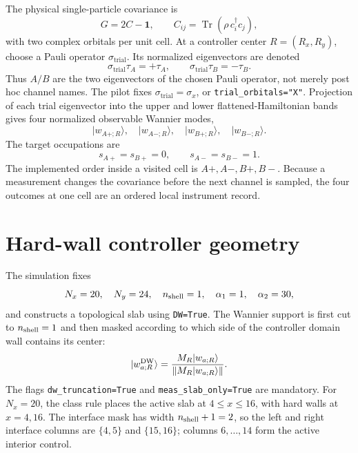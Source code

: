 \documentclass[aps,prb,onecolumn,nofootinbib,superscriptaddress]{revtex4-2}
\newcommand{\Tr}{\operatorname{Tr}}
\newcommand{\ket}[1]{\lvert #1\rangle}
\begin{document}
The physical single-particle covariance is
\begin{equation}
 G=2C-\bm{1},\qquad
 C_{ij}=\Tr(\rho\,c_i^\dagger c_j),
\end{equation}
with two complex orbitals per unit cell.  At a controller center
\(R=(R_x,R_y)\), choose a Pauli operator
\(\sigma_{\mathrm{trial}}\).  Its normalized eigenvectors are denoted
\begin{equation}
 \sigma_{\mathrm{trial}}\tau_A=+\tau_A,\qquad
 \sigma_{\mathrm{trial}}\tau_B=-\tau_B.
 \label{eq:trial-eigenvectors}
\end{equation}
Thus \(A/B\) are the two eigenvectors of the chosen Pauli operator, not merely
post hoc channel names.  The pilot fixes
\(\sigma_{\mathrm{trial}}=\sigma_x\), or
\texttt{trial\_orbitals="X"}.  Projection of each trial eigenvector into the
upper and lower flattened-Hamiltonian bands gives four normalized observable
Wannier modes,
\begin{equation}
 \ket{w_{A+;R}},\quad \ket{w_{A-;R}},\quad
 \ket{w_{B+;R}},\quad \ket{w_{B-;R}}.
\end{equation}
The target occupations are
\begin{equation}
 s_{A+}=s_{B+}=0,\qquad s_{A-}=s_{B-}=1.
 \label{eq:targets}
\end{equation}
The implemented order inside a visited cell is \(A+,A-,B+,B-\).  Because a
measurement changes the covariance before the next channel is sampled, the
four outcomes at one cell are an ordered local instrument record.

\section{Hard-wall controller geometry}

The simulation fixes
\begin{equation}
 N_x=20,\quad N_y=24,\quad n_{\rm shell}=1,\quad
 \alpha_1=1,\quad \alpha_2=30,
 \label{eq:parameters}
\end{equation}
and constructs a topological slab using
\texttt{DW=True}.  The Wannier support is first cut to \(n_{\rm shell}=1\) and
then masked according to which side of the controller domain wall contains its
center:
\begin{equation}
 \ket{w^{\rm DW}_{a;R}}
 =
 \frac{M_R\ket{w_{a;R}}}
 {\lVert M_R\ket{w_{a;R}}\rVert}.
 \label{eq:wall-mask}
\end{equation}
The flags \texttt{dw\_truncation=True} and
\texttt{meas\_slab\_only=True} are mandatory.  For \(N_x=20\), the class rule
places the active slab at \(4\leq x\leq16\), with hard walls at \(x=4,16\).
The interface mask has width
\(n_{\rm shell}+1=2\), so the left and right interface columns are
\(\{4,5\}\) and \(\{15,16\}\); columns \(6,\ldots,14\) form the active
interior control.
\end{document}
